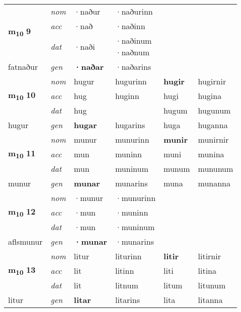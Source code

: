 \begin{longtable}[l]{X>{\footnotesize\itshape}XXXXX}
\multirow{3}{*}{{{\textbf{m{\textsubscript{10}}} \Large{\textbf{9}}}}}  
 & nom & ·naður & ·naðurinn    & \textbf{} &   \\*
 & acc & ·nað  & ·naðinn   &   &  \\*
 & dat & ·naði & \specialcell{·naðinum\\  ·naðnum}   &  &  \\*
 {\footnotesize{fatnaður}} &  gen & \textbf{·naðar}  & ·naðarins  &  &  \\
\cmidrule{1-6}


\multirow{3}{*}{{{\textbf{m{\textsubscript{10}}} \Large{\textbf{10}}}}}  
 & nom & hugur & hugurinn    & \textbf{hugir} & hugirnir  \\*
 & acc & hug  & huginn   & hugi  & hugina \\*
 & dat & hug &    & hugum & hugunum \\*
 {\footnotesize{hugur}} &  gen & \textbf{hugar}  & hugarins  & huga & huganna \\
\cmidrule{1-6}


\multirow{3}{*}{{{\textbf{m{\textsubscript{10}}} \Large{\textbf{11}}}}}  
 & nom & munur & munurinn    & \textbf{munir} & munirnir  \\*
 & acc & mun  & muninn   & muni  & munina \\*
 & dat & mun & muninum   & munum & mununum \\*
 {\footnotesize{munur}} &  gen & \textbf{munar}  & munarins  & muna & munanna \\
\cmidrule{1-6}


\multirow{3}{*}{{{\textbf{m{\textsubscript{10}}} \Large{\textbf{12}}}}}  
 & nom & ·munur & ·munurinn    & \textbf{} &   \\*
 & acc & ·mun  & ·muninn   &   &  \\*
 & dat & ·mun & ·muninum   &  &  \\*
 {\footnotesize{aflsmunur}} &  gen & \textbf{·munar}  & ·munarins  &  &  \\
\cmidrule{1-6}


\multirow{3}{*}{{{\textbf{m{\textsubscript{10}}} \Large{\textbf{13}}}}}  
 & nom & litur & liturinn    & \textbf{litir} & litirnir  \\*
 & acc & lit  & litinn   & liti  & litina \\*
 & dat & lit & litnum   & litum & litunum \\*
 {\footnotesize{litur}} &  gen & \textbf{litar}  & litarins  & lita & litanna \\
\cmidrule{1-6}



\end{longtable}
